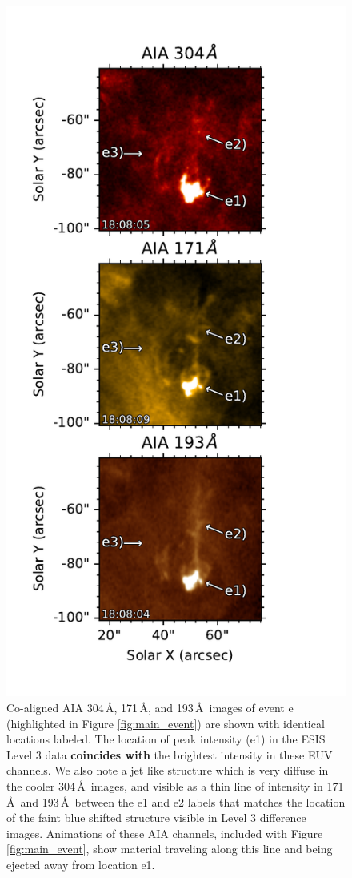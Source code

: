 \documentclass[linenumbers,trackchanges]{aastex63}
\begin{document}
   		\begin{figure}
    		\includegraphics{main_event_aia_context}
    		\centering
    		\caption{Co-aligned AIA 304\,\AA, 171\,\AA, and 193\,\AA\ images of event e  (highlighted in Figure \ref{fig:main_event}) are shown with identical locations labeled. The location of peak intensity (e1) in the ESIS Level 3 data \textbf{coincides with} the brightest intensity in these EUV channels. We also note a jet like structure which is very diffuse in the cooler 304\,\AA\ images, and visible as a thin line of intensity in 171\,\AA \ and 193\,\AA \ between the e1 and e2 labels that matches the location of the faint blue shifted structure visible in Level 3 difference images. Animations of these AIA channels, included with Figure \ref{fig:main_event}, show material traveling along this line and being ejected away from location e1.}
    		\label{fig:main_event_aia}
    	\end{figure}
		
\end{document}
